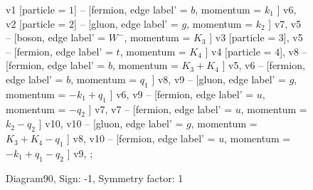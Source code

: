 \documentclass{revtex4}
\begin{document}
\begin{figure}[!htb]
\begin{center}
{    %
v1 [particle = \(1\)] -- [fermion, edge label' = \(b\), momentum = \(k_{1}\) ] v6, 
v2 [particle = \(2\)] -- [gluon, edge label' = \(g\), momentum = \(k_{2}\) ] v7, 
v5 -- [boson, edge label' = \(W^{-}\), momentum = \(K_{3}\) ] v3 [particle = \(3\)], 
v5 -- [fermion, edge label' = \(t\), momentum = \(K_{4}\) ] v4 [particle = \(4\)], 
v8 -- [fermion, edge label' = \(b\), momentum = \(K_{3} + K_{4}\) ] v5, 
v6 -- [fermion, edge label' = \(b\), momentum = \(q_{1}\) ] v8, 
v9 -- [gluon, edge label' = \(g\), momentum = \(-k_{1} + q_{1}\) ] v6, 
v9 -- [fermion, edge label' = \(u\), momentum = \(-q_{2}\) ] v7, 
v7 -- [fermion, edge label' = \(u\), momentum = \(k_{2} - q_{2}\) ] v10, 
v10 -- [gluon, edge label' = \(g\), momentum = \(K_{3} + K_{4} - q_{1}\) ] v8, 
v10 -- [fermion, edge label' = \(u\), momentum = \(-k_{1} + q_{1} - q_{2}\) ] v9, 
};
\end{center}
\caption{Diagram90, Sign: -1, Symmetry factor: 1}
\end{figure}
\newpage
\end{document}
